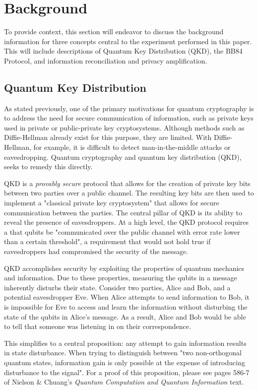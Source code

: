 \documentclass[12]{amsart}
\begin{document}
\section{Background}

To provide context, this section will endeavor to discuss the background information for three concepts central to the experiment performed in this paper. This will include descriptions of Quantum Key Distribution (QKD), the BB84 Protocol, and information reconciliation and privacy amplification. 

\subsection{Quantum Key Distribution}
As stated previously, one of the primary motivations for quantum cryptography is to address the need for secure communication of information, such as private keys used in private or public-private key cryptosystems. Although methods such as Diffie-Hellman 
\cite{DH} already exist for this purpose, they are limited. With Diffie-Hellman, for example, it is difficult to detect man-in-the-middle attacks or eavesdropping. Quantum cryptography and quantum key distribution (QKD), seeks to remedy this directly.

QKD is a \textit{provably secure} protocol that allows for the creation of private key bits between two parties over a public channel. The resulting key bits are then used to implement a "classical private key cryptosystem" that allows for secure communication between the parties\cite{text}. The central pillar of QKD is its ability to reveal the presence of eavesdroppers. At a high level, the QKD protocol requires a that qubits be "communicated over the public channel with error rate lower than a certain threshold"\cite{text}, a requirement that would not hold true if eavesdroppers had compromised the security of the message.

QKD accomplishes security by exploiting the properties of quantum mechanics and information. Due to these properties, measuring the qubits in a message inherently disturbs their state. Consider two parties, Alice and Bob, and a potential eavesdropper Eve. When Alice attempts to send information to Bob, it is impossible for Eve to access and learn the information without disturbing the state of the qubits in Alice's message. As a result, Alice and Bob would be able to tell that someone was listening in on their correspondence\cite{text}.

This simplifies to a central proposition: any attempt to gain information results in state disturbance. When trying to distinguish between "two non-orthogonal quantum states, information gain is only possible at the expense of introducing disturbance to the signal"\cite{text}. For a proof of this proposition, please see pages 586-7 of Nielson \& Chuang's \textit{Quantum Computation and Quantum Information} text.
\end{document}
